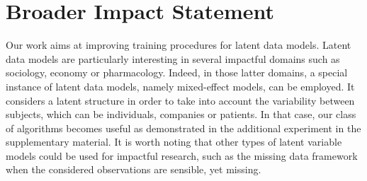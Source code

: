 \documentclass[11pt]{article}
\theoremstyle{t}
\begin{document}
\newpage
\section{Broader Impact Statement}
Our work aims at improving training procedures for latent data models. 
Latent data models are particularly interesting in several impactful domains such as sociology, economy or pharmacology.
Indeed, in those latter domains, a special instance of latent data models, namely mixed-effect models, can be employed. 
It considers a latent structure in order to take into account the variability between subjects, which can be individuals, companies or patients.
In that case, our class of algorithms becomes useful as demonstrated in the additional experiment in the supplementary material.
It is worth noting that other types of latent variable models could be used for impactful research, such as the missing data framework when the considered observations are sensible, yet missing.

\linespread{1.1}
\normalsize





\linespread{1}
\newpage


\appendix
\end{document}
